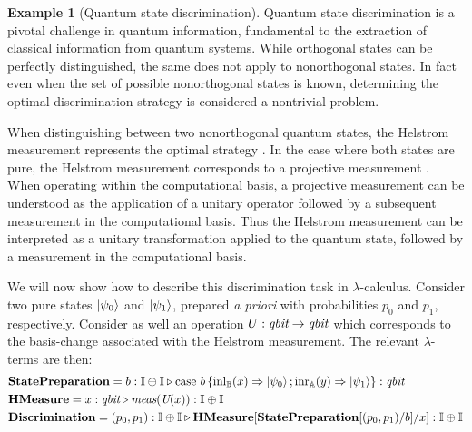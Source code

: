 \documentclass[10pt,a4paper]{amsart}
\theoremstyle{definition}
\theoremstyle{definition}
\newtheorem{example}[definition]{Example}
\theoremstyle{definition}
\theoremstyle{definition}
\theoremstyle{definition}
\theoremstyle{definition}
\begin{document}
\begin{example}[Quantum state discrimination]

Quantum state discrimination is a pivotal challenge in quantum information,
fundamental to the extraction of classical information from quantum systems.
While orthogonal states can be perfectly distinguished, the same does not apply
to nonorthogonal states. In fact even when the set of possible nonorthogonal
states is known, determining the optimal discrimination strategy is considered
a nontrivial problem.

When distinguishing between two nonorthogonal quantum states, the Helstrom
measurement represents the optimal strategy
\cite{helstromQuantumDetectionEstimation1976}. In the case where both states
are pure, the Helstrom measurement corresponds to a projective measurement
\cite{barnett2009quantum}.  When operating within the computational basis, a
projective measurement can be understood as the application of a unitary
operator followed by a subsequent measurement in the computational basis. Thus
the Helstrom measurement can be interpreted as a unitary transformation applied
to the quantum state, followed by a measurement in the computational basis. 

We will now show how to describe this discrimination task in
$\lambda$-calculus.  Consider two pure states $\ket{\psi_0}$ and
$\ket{\psi_1}$, prepared \emph{a priori} with probabilities $p_0$ and $p_1$,
respectively. Consider as well an operation $U : \emph{qbit} \to \emph{qbit}$ which
corresponds to the basis-change associated with the Helstrom measurement.
The relevant $\lambda$-terms are then:
\begin{align*}
  &\textbf{StatePreparation} =  b: \mathbb{I} \oplus \mathbb{I}  \triangleright  \text{case } b\,
  \{\mathrm{inl}_{\mathbb{B}}(x) \Rightarrow \ket{\psi_0} ; \mathrm{inr}_{\mathbb{A}}(y) \Rightarrow \ket{\psi_1}\}: \textit{qbit} \\
  &\textbf{HMeasure} =  x : \emph{qbit} \triangleright \emph{meas} (\emph{U}(x)): \mathbb{I} \oplus \mathbb{I} \\
  &\textbf{Discrimination} = (p_0,p_1): \mathbb{I}\oplus \mathbb{I} \triangleright \textbf{HMeasure} [ \textbf{StatePreparation} [(p_0,p_1)/ b] / x] : \mathbb{I}\oplus \mathbb{I}
\end{align*}
\end{example}
\end{document}
